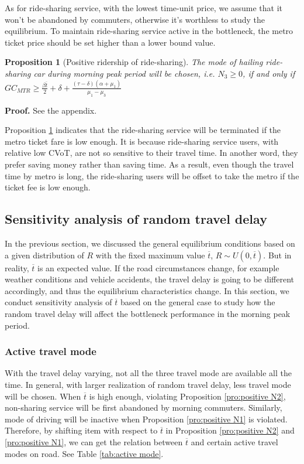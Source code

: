 \documentclass[a4paper,11pt]{article}
\newtheorem{proposition}[theorem]{Proposition}
\begin{document}
As for ride-sharing service, with the lowest time-unit price, we assume that it won't be abandoned by commuters, otherwise it's worthless to study the equilibrium. To maintain ride-sharing service active in the bottleneck, the metro ticket price should be set higher than a lower bound value.

\begin{proposition}[Positive ridership of ride-sharing] \label{pro:positive N3}
    The mode of hailing ride-sharing car during morning peak period will be chosen, i.e. $N_3\geq 0$, if and only if $GC_{MTR}\geq \frac{\beta \overline{t}}{2}+\delta+\frac{\left(\tau-\delta\right)\left(\alpha+\mu_1\right)}{\mu_1-\mu_3}$
\end{proposition}
\textbf{Proof.} See the appendix.

Proposition \ref{pro:positive N3} indicates that the ride-sharing service will be terminated if the metro ticket fare is low enough. It is because ride-sharing service users, with relative low CVoT, are not so sensitive to their travel time. In another word, they prefer saving money rather than saving time. As a result, even though the travel time by metro is long, the ride-sharing users will be offset to take the metro if the ticket fee is low enough. 


\subsection{Sensitivity analysis of random travel delay}\label{subs:sensitivity test}

In the previous section, we discussed the general equilibrium conditions based on a given distribution of $R$ with the fixed maximum value $\overline{t}$, $R\sim U(0,\overline{t})$. But in reality, $\overline{t}$ is an expected value. If the road circumstances change, for example weather conditions and vehicle accidents, the travel delay is going to be different accordingly, and thus the equilibrium characteristics change. In this section, we conduct sensitivity analysis of $\overline{t}$ based on the general case to study how the random travel delay will affect the bottleneck performance in the morning peak period. 

\subsubsection{Active travel mode }\label{subsubs:Active travel mode}

With the travel delay varying, not all the three travel mode are available all the time. In general, with larger realization of random travel delay, less travel mode will be chosen. When $\overline{t}$ is high enough, violating Proposition \ref{pro:positive N2}, non-sharing service will be first abandoned by morning commuters. Similarly, mode of driving will be inactive when  Proposition \ref{pro:positive N1} is violated. Therefore, by shifting item with respect to $\overline{t}$ in Proposition \ref{pro:positive N2} and \ref{pro:positive N1}, we can get the relation between $\overline{t}$ and certain active travel modes on road. See Table \ref{tab:active mode}.
\end{document}
